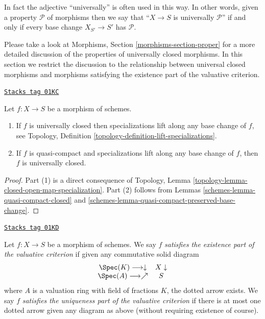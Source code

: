 In fact the adjective ``universally'' is often used in this way.
In other words, given a property $\mathcal{P}$ of morphisms
then we say that ``$X \to S$ is universally $\mathcal{P}$''
if and only if every base change $X_{S'} \to S'$ has $\mathcal{P}$.

\medskip\noindent
Please take a look at Morphisms, Section \ref{morphisms-section-proper} for a
more detailed discussion of the properties of universally closed morphisms.
In this section we restrict the discussion to the relationship between
universal closed morphisms and morphisms satisfying the
existence part of the valuative criterion.

\begin{lemma}
\label{schemes-lemma-specializations-lift}
\href{https://stacks.math.columbia.edu/tag/01KC}{\texttt{Stacks tag 01KC}}

Let $f : X \to S$ be a morphism of schemes.
\begin{enumerate}
\item If $f$ is universally closed then specializations lift
along any base change of $f$, see
Topology, Definition \ref{topology-definition-lift-specializations}.
\item If $f$ is quasi-compact and specializations lift
along any base change of $f$, then $f$ is universally closed.
\end{enumerate}
\end{lemma}

\begin{proof}

Part (1) is a direct consequence of
Topology, Lemma \ref{topology-lemma-closed-open-map-specialization}.
Part (2) follows from
Lemmas \ref{schemes-lemma-quasi-compact-closed} and
\ref{schemes-lemma-quasi-compact-preserved-base-change}.
\end{proof}

\begin{definition}
\label{schemes-definition-valuative-criterion}
\href{https://stacks.math.columbia.edu/tag/01KD}{\texttt{Stacks tag 01KD}}

Let $f : X \to S$ be a morphism of schemes. We say $f$
{\it satisfies the existence part of the valuative criterion}
if given any commutative solid diagram
$$
\begin{array}{cc}\Spec(K) \longrightarrow\downarrow & X \downarrow \\ \Spec(A) \longrightarrow\nearrow & S\end{array}
$$
where $A$ is a valuation ring with field of fractions $K$, the
dotted arrow exists. We say $f$ {\it satisfies the uniqueness
part of the valuative criterion} if there is at most one
dotted arrow given any diagram as above (without requiring
existence of course).
\end{definition}

